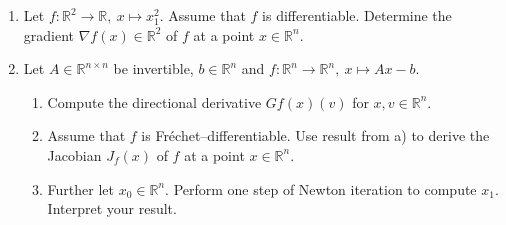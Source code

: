 \vspace*{-0.5cm}
\begin{enumerate}
\item Let $f : \mathbb{R}^{2} \to \mathbb{R},~ x \mapsto x^2_1$. Assume that $f$ is differentiable. Determine the gradient $\nabla f(x) \in \mathbb{R}^2$ of $f$ at a point $x \in\mathbb{R}^{n}$.
	\item Let $A\in \mathbb{R}^{n \times n}$ be invertible, $b \in\mathbb{R}^n$ and $f : \mathbb{R}^{n} \to \mathbb{R}^n, ~x \mapsto Ax -b $.
	\begin{enumerate}
		\item Compute the directional derivative $Gf(x)(v)$ for $x,v\in\mathbb{R}^n$.
		\item Assume that $f$ is Fréchet--differentiable. Use result from a) to derive the Jacobian $J_f(x)$ of $f$ at a point $x \in\mathbb{R}^{n}$.
		\item Further let $x_0 \in \mathbb{R}^n$. Perform one step of Newton iteration to compute $x_1$. Interpret your result.
	\end{enumerate} 
	
\end{enumerate}
 